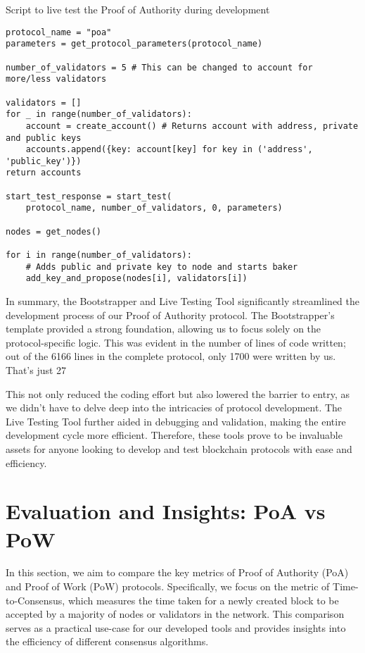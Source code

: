\begin{listing}[H]
\caption{Script to live test the Proof of Authority during development}
\label{lst:python_code}
\begin{verbatim}
protocol_name = "poa"
parameters = get_protocol_parameters(protocol_name)

number_of_validators = 5 # This can be changed to account for more/less validators

validators = []
for _ in range(number_of_validators):
    account = create_account() # Returns account with address, private and public keys
    accounts.append({key: account[key] for key in ('address', 'public_key')})
return accounts

start_test_response = start_test(
    protocol_name, number_of_validators, 0, parameters)

nodes = get_nodes() 

for i in range(number_of_validators):
    # Adds public and private key to node and starts baker
    add_key_and_propose(nodes[i], validators[i])
\end{verbatim}
\end{listing}



In summary, the Bootstrapper and Live Testing Tool significantly streamlined the development process of our Proof of Authority protocol. The Bootstrapper's template provided a strong foundation, allowing us to focus solely on the protocol-specific logic. This was evident in the number of lines of code written; out of the 6166 lines in the complete protocol, only 1700 were written by us. That's just 27%

This not only reduced the coding effort but also lowered the barrier to entry, as we didn't have to delve deep into the intricacies of protocol development. The Live Testing Tool further aided in debugging and validation, making the entire development cycle more efficient. Therefore, these tools prove to be invaluable assets for anyone looking to develop and test blockchain protocols with ease and efficiency.



\section{Evaluation and Insights: PoA vs PoW}

In this section, we aim to compare the key metrics of Proof of Authority (PoA) and Proof of Work (PoW) protocols. Specifically, we focus on the metric of Time-to-Consensus, which measures the time taken for a newly created block to be accepted by a majority of nodes or validators in the network. This comparison serves as a practical use-case for our developed tools and provides insights into the efficiency of different consensus algorithms.

